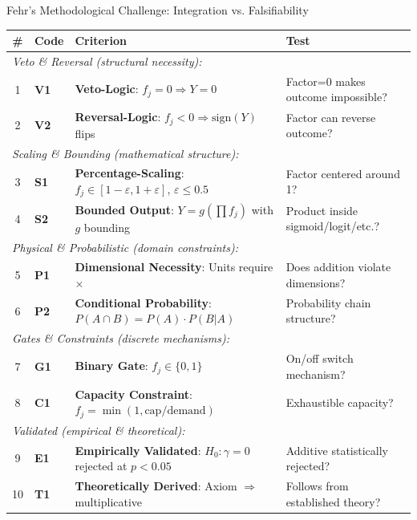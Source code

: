 \begin{chapter}{Fehr's Methodological Challenge: Integration vs. Falsifiability}
\begin{axiom}
\begin{center}
\renewcommand{\arraystretch}{1.3}
\small
\begin{tabular}{@{}clp{5.5cm}p{4cm}@{}}
\toprule
\textbf{\#} & \textbf{Code} & \textbf{Criterion} & \textbf{Test} \\
\midrule
\multicolumn{4}{l}{\textit{Veto \& Reversal (structural necessity):}} \\
1 & \textbf{V1} & \textbf{Veto-Logic}: $f_j = 0 \Rightarrow Y = 0$ & Factor=0 makes outcome impossible? \\
2 & \textbf{V2} & \textbf{Reversal-Logic}: $f_j < 0 \Rightarrow \text{sign}(Y)$ flips & Factor can reverse outcome? \\
\midrule
\multicolumn{4}{l}{\textit{Scaling \& Bounding (mathematical structure):}} \\
3 & \textbf{S1} & \textbf{Percentage-Scaling}: $f_j \in [1-\varepsilon, 1+\varepsilon]$, $\varepsilon \leq 0.5$ & Factor centered around 1? \\
4 & \textbf{S2} & \textbf{Bounded Output}: $Y = g(\prod f_j)$ with $g$ bounding & Product inside sigmoid/logit/etc.? \\
\midrule
\multicolumn{4}{l}{\textit{Physical \& Probabilistic (domain constraints):}} \\
5 & \textbf{P1} & \textbf{Dimensional Necessity}: Units require $\times$ & Does addition violate dimensions? \\
6 & \textbf{P2} & \textbf{Conditional Probability}: $P(A \cap B) = P(A) \cdot P(B|A)$ & Probability chain structure? \\
\midrule
\multicolumn{4}{l}{\textit{Gates \& Constraints (discrete mechanisms):}} \\
7 & \textbf{G1} & \textbf{Binary Gate}: $f_j \in \{0, 1\}$ & On/off switch mechanism? \\
8 & \textbf{C1} & \textbf{Capacity Constraint}: $f_j = \min(1, \text{cap}/\text{demand})$ & Exhaustible capacity? \\
\midrule
\multicolumn{4}{l}{\textit{Validated (empirical \& theoretical):}} \\
9 & \textbf{E1} & \textbf{Empirically Validated}: $H_0: \gamma=0$ rejected at $p<0.05$ & Additive statistically rejected? \\
10 & \textbf{T1} & \textbf{Theoretically Derived}: Axiom $\Rightarrow$ multiplicative & Follows from established theory? \\
\bottomrule
\end{tabular}
\end{center}


\end{axiom}
\end{chapter}

